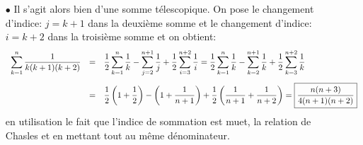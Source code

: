 \documentclass[a4paper, 11pt,reqno]{article}
\begin{document}
\begin{correction}
\begin{enumerate}
\begin{itemize}
\begin{itemize}
\item[$\bullet$]  Il s'agit alors bien d'une somme t\'elescopique. On pose le changement d'indice: $j=k+1$ dans la deuxi\`{e}me somme et le changement d'indice: $i=k+2$ dans la troisi\`{e}me somme et on obtient:
$$
\begin{array}{lll}
\ddp \sum\limits_{k=1}^{n}  \ddp\frac{1}{k(k+1)(k+2)}
&=&\ddp\demi\ddp \sum\limits_{k=1}^{n}  \ddp\frac{1}{k}-\ddp \sum\limits_{j=2}^{n+1}  \ddp\frac{1}{j}+\ddp\demi\ddp \sum\limits_{i=3}^{n+2} \ddp\frac{1}{i}=\ddp\demi\ddp \sum\limits_{k=1}^{n}  \ddp\frac{1}{k}-\ddp \sum\limits_{k=2}^{n+1}  \ddp\frac{1}{k}+\ddp\demi\ddp \sum\limits_{k=3}^{n+2} \ddp\frac{1}{k}\vsec\\
&=&
\ddp\demi\left(  1+\ddp\demi \right)-\left(  1+\ddp\frac{1}{n+1} \right)+\ddp\demi\left( \ddp\frac{1}{n+1} +\ddp\frac{1}{n+2}    \right)
=\fbox{$\ddp\frac{n(n+3)}{4(n+1)(n+2)}$}\end{array}$$ en utilisation le fait que l'indice de sommation est muet, la relation de Chasles et en mettant tout au m\^{e}me d\'enominateur.
\end{itemize}


\end{itemize}
\end{enumerate}
\end{correction}
\end{document}
